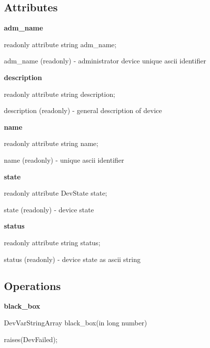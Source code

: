 \subsection{Attributes}

\textbf{adm\_name}

readonly attribute string adm\_name;

adm\_name (readonly) - administrator device unique ascii identifier\\

\begin{flushleft}
\textbf{description}
\par\end{flushleft}

readonly attribute string description;

description (readonly) - general description of device\\

\begin{flushleft}
\textbf{name}
\par\end{flushleft}

readonly attribute string name;

name (readonly) - unique ascii identifier\\

\begin{flushleft}
\textbf{state}
\par\end{flushleft}

readonly attribute DevState state;

state (readonly) - device state\\

\begin{flushleft}
\textbf{status}
\par\end{flushleft}

readonly attribute string status;

status (readonly) - device state as ascii string

\subsection{Operations}

\textbf{black\_box}

DevVarStringArray black\_box(in long number)

raises(DevFailed);\\

